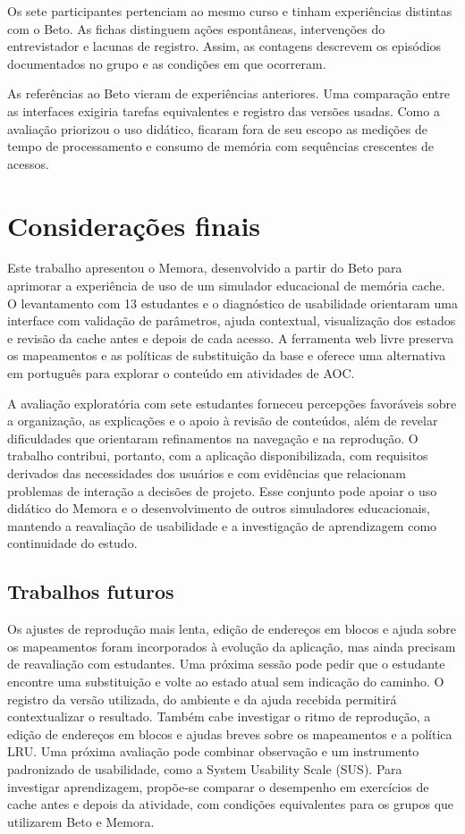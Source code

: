 \documentclass[article,12pt,oneside,a4paper,english,brazil]{abntex2}
\begin{document}
Os sete participantes pertenciam ao mesmo curso e tinham experiências distintas com o Beto. As fichas distinguem ações espontâneas, intervenções do entrevistador e lacunas de registro. Assim, as contagens descrevem os episódios documentados no grupo e as condições em que ocorreram.

As referências ao Beto vieram de experiências anteriores. Uma comparação entre as interfaces exigiria tarefas equivalentes e registro das versões usadas. Como a avaliação priorizou o uso didático, ficaram fora de seu escopo as medições de tempo de processamento e consumo de memória com sequências crescentes de acessos.

\section{Considerações finais}
\label{sec:conclusoes}

Este trabalho apresentou o Memora, desenvolvido a partir do Beto para aprimorar a experiência de uso de um simulador educacional de memória cache. O levantamento com 13 estudantes e o diagnóstico de usabilidade orientaram uma interface com validação de parâmetros, ajuda contextual, visualização dos estados e revisão da cache antes e depois de cada acesso. A ferramenta web livre preserva os mapeamentos e as políticas de substituição da base e oferece uma alternativa em português para explorar o conteúdo em atividades de AOC.

A avaliação exploratória com sete estudantes forneceu percepções favoráveis sobre a organização, as explicações e o apoio à revisão de conteúdos, além de revelar dificuldades que orientaram refinamentos na navegação e na reprodução. O trabalho contribui, portanto, com a aplicação disponibilizada, com requisitos derivados das necessidades dos usuários e com evidências que relacionam problemas de interação a decisões de projeto. Esse conjunto pode apoiar o uso didático do Memora e o desenvolvimento de outros simuladores educacionais, mantendo a reavaliação de usabilidade e a investigação de aprendizagem como continuidade do estudo.

\subsection{Trabalhos futuros}
\label{sec:futuros}

Os ajustes de reprodução mais lenta, edição de endereços em blocos e ajuda sobre os mapeamentos foram incorporados à evolução da aplicação, mas ainda precisam de reavaliação com estudantes. Uma próxima sessão pode pedir que o estudante encontre uma substituição e volte ao estado atual sem indicação do caminho. O registro da versão utilizada, do ambiente e da ajuda recebida permitirá contextualizar o resultado. Também cabe investigar o ritmo de reprodução, a edição de endereços em blocos e ajudas breves sobre os mapeamentos e a política LRU. Uma próxima avaliação pode combinar observação e um instrumento padronizado de usabilidade, como a System Usability Scale (SUS). Para investigar aprendizagem, propõe-se comparar o desempenho em exercícios de cache antes e depois da atividade, com condições equivalentes para os grupos que utilizarem Beto e Memora.
\end{document}
